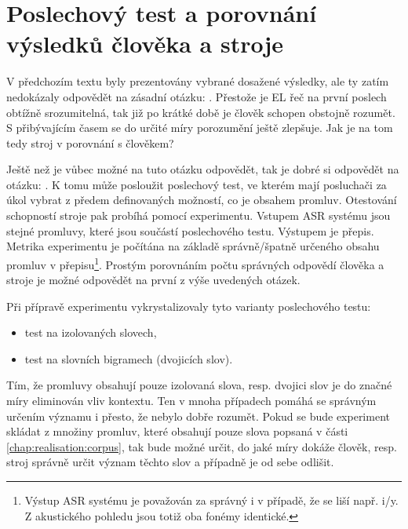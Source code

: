 \section{Poslechový test a porovnání výsledků člověka a stroje}
\label{chap:realisation:listening}

V předchozím textu byly prezentovány vybrané dosažené výsledky, ale ty zatím nedokázaly odpovědět na zásadní otázku: .
Přestože je EL řeč na první poslech obtížně srozumitelná, tak již po krátké době je člověk schopen obstojně rozumět.
S přibývajícím časem se do určité míry porozumění ještě zlepšuje.
Jak je na tom tedy stroj v porovnání s člověkem?

Ještě než je vůbec možné na tuto otázku odpovědět, tak je dobré si odpovědět na otázku: .
K tomu může posloužit poslechový test, ve kterém mají posluchači za úkol vybrat z předem definovaných možností, co je obsahem promluv.
Otestování schopností stroje pak probíhá pomocí experimentu.
Vstupem ASR systému jsou stejné promluvy, které jsou součástí poslechového testu.
Výstupem je přepis.
Metrika experimentu je počítána na základě správně/špatně určeného obsahu promluv v přepisu\footnote{Výstup ASR systému je považován za správný i v případě, že se liší např. i/y. Z akustického pohledu jsou totiž oba fonémy identické.}.
Prostým porovnáním počtu správných odpovědí člověka a stroje je možné odpovědět na první z výše uvedených otázek.

Při přípravě experimentu vykrystalizovaly tyto varianty poslechového testu:

\begin{itemize}
  \item test na izolovaných slovech,
  \item test na slovních bigramech (dvojicích slov).
\end{itemize}

\noindent Tím, že promluvy obsahují pouze izolovaná slova, resp. dvojici slov je do značné míry eliminován vliv kontextu.
Ten v mnoha případech pomáhá se správným určením významu i přesto, že nebylo dobře rozumět.
Pokud se bude experiment skládat z množiny promluv, které obsahují pouze slova popsaná v části \ref{chap:realisation:corpus}, tak bude možné určit, do jaké míry dokáže člověk, resp. stroj správně určit význam těchto slov a případně je od sebe odlišit.

